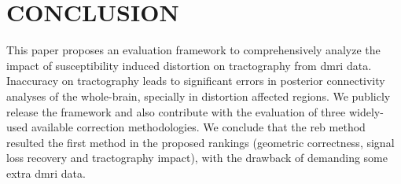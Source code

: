 \section{CONCLUSION}

This paper proposes an evaluation framework to
comprehensively analyze the impact of susceptibility
induced distortion on tractography from \gls*{dmri}
data. Inaccuracy on tractography leads to significant
errors in posterior connectivity analyses of the
whole-brain, specially in distortion affected regions.
We publicly release the framework and also contribute
with the evaluation of three widely-used available
correction methodologies. We conclude that the 
\gls*{reb} method resulted the first method in the 
proposed rankings (geometric correctness, signal loss
recovery and tractography impact), with the drawback
of demanding some extra \gls*{dmri} data.